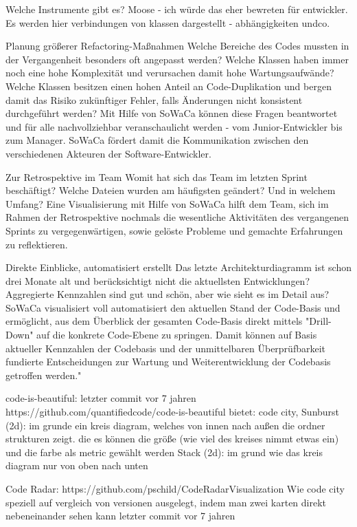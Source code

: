 Welche Instrumente gibt es?
Moose - ich würde das eher bewreten für entwickler. Es werden hier verbindungen von klassen dargestellt - abhängigkeiten undco.



Planung größerer Refactoring-Maßnahmen
Welche Bereiche des Codes mussten in der Vergangenheit besonders oft angepasst werden? Welche Klassen haben immer noch eine hohe Komplexität und verursachen damit hohe Wartungsaufwände? Welche Klassen besitzen einen hohen Anteil an Code-Duplikation und bergen damit das Risiko zukünftiger Fehler, falls Änderungen nicht konsistent durchgeführt werden? Mit Hilfe von SoWaCa können diese Fragen beantwortet und für alle nachvollziehbar veranschaulicht werden - vom Junior-Entwickler bis zum Manager. SoWaCa fördert damit die Kommunikation zwischen den verschiedenen Akteuren der Software-Entwickler.

Zur Retrospektive im Team
Womit hat sich das Team im letzten Sprint beschäftigt? Welche Dateien wurden am häufigsten geändert? Und in welchem Umfang? Eine Visualisierung mit Hilfe von SoWaCa hilft dem Team, sich im Rahmen der Retrospektive nochmals die wesentliche Aktivitäten des vergangenen Sprints zu vergegenwärtigen, sowie gelöste Probleme und gemachte Erfahrungen zu reflektieren.

Direkte Einblicke, automatisiert erstellt
Das letzte Architekturdiagramm ist schon drei Monate alt und berücksichtigt nicht die aktuellsten Entwicklungen? Aggregierte Kennzahlen sind gut und schön, aber wie sieht es im Detail aus? SoWaCa visualisiert voll automatisiert den aktuellen Stand der Code-Basis und ermöglicht, aus dem Überblick der gesamten Code-Basis direkt mittels "Drill-Down" auf die konkrete Code-Ebene zu springen. Damit können auf Basis aktueller Kennzahlen der Codebasis und der unmittelbaren Überprüfbarkeit fundierte Entscheidungen zur Wartung und Weiterentwicklung der Codebasis getroffen werden."
\cite{systect_2015}


code-is-beautiful: letzter commit vor 7 jahren
https://github.com/quantifiedcode/code-is-beautiful
bietet: code city, 
Sunburst (2d): im grunde ein kreis diagram, welches von  innen nach außen die ordner strukturen zeigt. die es können die größe (wie viel des kreises nimmt etwas ein) und die farbe als metric gewählt werden
Stack (2d): im grund wie das kreis diagram nur von oben nach unten


Code Radar:
https://github.com/pschild/CodeRadarVisualization
Wie code city speziell auf vergleich von versionen ausgelegt, indem man zwei karten direkt nebeneinander sehen kann
letzter commit vor 7 jahren


